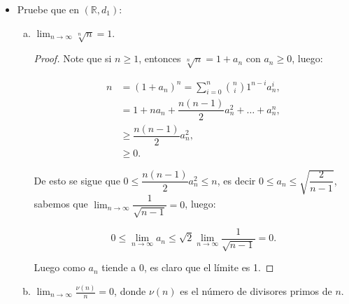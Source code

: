 \begin{itemize}[leftmargin=*]
\begin{proof}
\begin{itemize}
\begin{align*}
                \frac{d(x,z)}{1+d(x,z)+d(z,y)}\leq \frac{d(x,z)}{1+d(x,z)},\\
                \frac{d(z,y)}{1+d(x,z)+d(z,y)}\leq \frac{d(z,y)}{1+d(z,y)}.
            \end{align*}
            De esta manera
            \begin{align*}
                d'(x,y)=\frac{d(x,y)}{1+d(x,y)}&\leq \frac{d(x,z)}{1+d(x,z)+d(z,y)}+\frac{d(z,y)}{1+d(x,z)+d(z,y)},\\
                &\leq \frac{d(x,z)}{1+d(x,z)}+\frac{d(z,y)}{1+d(z,y)}=d'(x,z)+d'(z,y),
            \end{align*}
            lo cual completa la demostración.
        \end{itemize}
        
    \end{proof}

    \item Pruebe que en $(\mathbb{R},d_1)$:
    \begin{enumerate}[a)]
        \item $\displaystyle \lim_{n \rightarrow \infty} \sqrt[n]{n}=1$.\\

        \begin{proof} Note que si $n\geq 1$, entonces $\sqrt[n]{n}=1+a_n$ con $a_n\geq 0$, luego:

        \begin{align*}
            n&=(1+a_n)^n=\sum_{i=0
            }^n\binom{n}{i}1^{n-i}a_n^i,\\
            &=1+n a_n+\dfrac{n(n-1)}{2}a_n^2+\ldots+a_n^n,\\
            &\geq \dfrac{n(n-1)}{2}a_n^2,\\
            &\geq 0.
        \end{align*}

De esto se sigue que $0\leq \dfrac{n(n-1)}{2}a_n^2\leq n$, es decir $0\leq a_n\leq \sqrt{\dfrac{2}{n-1}}$, sabemos que $\lim_{n\to \infty}\dfrac{1}{\sqrt{n-1}}=0$, luego:

$$0\leq \lim_{n\to \infty}a_n\leq \sqrt{2}\lim_{n\to \infty}\dfrac{1}{\sqrt{n-1}}=0.$$

Luego como $a_n$ tiende a 0, es claro que el límite es 1.
        
        \end{proof}
        
        \item $\displaystyle \lim_{n \rightarrow \infty} \frac{\nu(n)}{n}=0$, 
        donde $\nu(n)$ es el número de divisores primos de $n$.\\


\end{enumerate}
\end{itemize}
